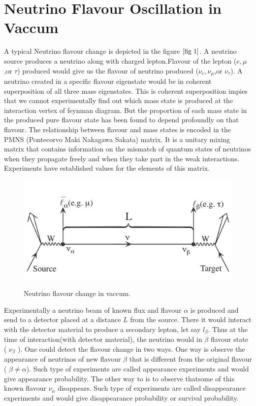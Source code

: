 \documentclass[12pt,a4paper]{report}
\begin{document}
\section{Neutrino Flavour Oscillation in Vaccum}
A typical Neutrino flavour change is depicted in the figure $\ref*{fig 1}$. A neutrino source produces a neutrino along with charged lepton.Flavour of the lepton ($e,\mu$,or $\tau$) produced would give us the flavour of neutrino produced ($\nu_{e},\nu_{\mu}$,or $\nu_{\tau}$). A neutrino created in a specific flavour eigenstate would be in coherent superposition of all three mass eigenstates. This is coherent superposition impies that we cannot experimentally find out which mass state is produced at the interaction vertex of feynman diagram. But the proportion of each mass state in the produced pure flavour state has been found to depend profoundly on that flavour. The relationship between flavour and mass states is encoded in the PMNS (Pontecorvo Maki Nakagawa Sakata) matrix. It is a unitary mixing matrix that contains information on the mismatch of quantum states of neutrinos when they propagate freely and when they take part in the weak interactions. Experiments have established values for the elements of this matrix\cite{zyla}.\par
\begin{figure}[h]
\graphicspath{ {./Images/} }	
{\includegraphics[width=\textwidth]{fig_1.png}}
\centering

\caption{ Neutrino flavour change in vaccum\cite{kayser}.}
\label{fig 1}
\end{figure}


Experimentally a neutrino beam of known flux and flavour $\alpha$ is produced and send to a detector placed at a distance $L$ from the source. There it would interact with the detector material to produce a secondary lepton, let say $l_{\beta}$.  Thus at the time of interaction(with detector material), the neutrino would in $\beta$ flavour state ( $\nu_{\beta}$ ). One could detect the flavour change in two ways. One way is observe the appearance of neutrinos of new flavour $\beta$ that is different from the original flavour ( $\beta\neq\alpha$). Such type of experiments are called appearance experiments and would give appearance probability. The other way to is to observe thatsome of this known flavour $\nu_{\alpha}$ disappears. Such type of experiments are called disappearance experiments and would give disappearance probability or survival probability.
\end{document}
